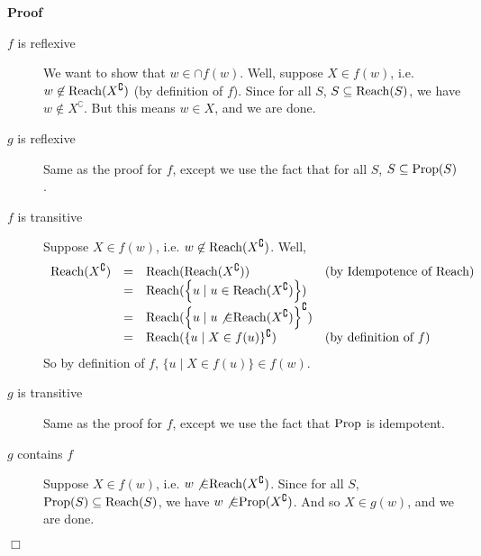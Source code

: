 \documentclass{article}
\newcommand{\nin}{\not\in}
\newcommand{\tmop}[1]{\ensuremath{\operatorname{#1}}}
\newenvironment{proof}{\noindent\textbf{Proof\ }}{\hspace*{\fill}$\Box$\medskip}
\newcommand{\Reach}{\textsf{\tmop{Reach}}}
\newcommand{\Prop}{\textsf{\tmop{Prop}}}
\begin{document}
\begin{proof}
\begin{description}
    \item[$f$ is reflexive] We want to show that $w \in \cap f (w)$. Well,
    suppose $X \in f (w)$, i.e. $w \nin \Reach (X^{\complement})$ (by
    definition of $f$). Since for all $S$, $S \subseteq \Reach (S)$, we have
    $w \nin X^{\complement}$. But this means $w \in X$, and we are done.
    
    \item[$g$ is reflexive] Same as the proof for $f$, except we use the fact
    that for all $S$, $S \subseteq \Prop (S)$.
    
    \item[$f$ is transitive] Suppose $X \in f (w)$, i.e. $w \nin \Reach
    (X^{\complement})$. Well,
    \[ \begin{array}{lcll}
         \Reach (X^{\complement}) & = & \Reach (\Reach (X^{\complement})) &
         \textrm{\text{(by Idempotence of }} \Reach)\\
         & = & \Reach (\left\{ u \mid u \in \Reach (X^{\complement})
         \right\}) & \\
         & = & \Reach (\left\{ u \mid u \not{\in} \Reach (X^{\complement})
         \right\}^{\complement}) & \\
         & = & \Reach (\{ u \mid X \in f (u) \}^{\complement}) &
         \textrm{\text{(by definition of }} f)
       \end{array} \]
    So by definition of $f$, $\{ u \mid X \in f (u) \} \in f (w)$.
    
    \item[$g$ is transitive] Same as the proof for $f$, except we use the fact
    that $\Prop$ is idempotent.
    
    \item[$g$ contains $f$] Suppose $X \in f (w)$, i.e. $w \not{\in} \Reach
    (X^{\complement})$. Since for all $S$, $\Prop (S) \subseteq \Reach (S)$,
    we have $w \not{\in} \Prop (X^{\complement})$. And so $X \in g (w)$, and
    we are done.
    

\end{description}
\end{proof}
\end{document}
